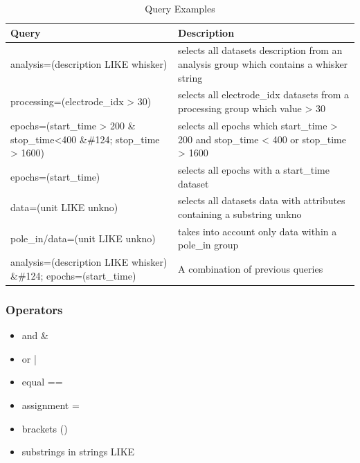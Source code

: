 \documentclass[utf8]{frontiersSCNS} %
\begin{document}
\begin{table}
\caption{Query Examples}
\label{tab:query-examples}       %

\begin{tabular}{ |p{7cm}|p{9cm}| }
\hline
	 \textbf{Query}                                  &       \textbf{Description} \\ \hline
	
	 analysis=(description LIKE whisker)  &  selects all datasets description from an analysis group which contains a whisker string  \\ \hline
	 processing=(electrode\_idx > 30)        &  selects all electrode\_idx datasets from a processing group which value > 30   \\ \hline
	 epochs=(start\_time > 200 \& stop\_time<400 \&\#124; stop\_time > 1600)  &  selects all epochs which start\_time > 200 and stop\_time < 400 or stop\_time > 1600 \\ \hline
	 epochs=(start\_time)                     &  selects all epochs with a start\_time dataset         \\ \hline
	 data=(unit LIKE unkno)  &  selects all datasets data with attributes containing a substring unkno \\ \hline
	 pole\_in/data=(unit LIKE unkno)  &  takes into account only data within a pole\_in group \\ \hline
	 analysis=(description LIKE whisker) \&\#124; epochs=(start\_time)   &  A combination of previous queries \\ \hline

\end{tabular}

\end{table}



\subsubsection{Operators}


\begin{itemize}
 \item and \&
 \item or  |
 \item equal ==
 \item assignment =
 \item brackets ()
 \item substrings in strings LIKE
\end{itemize}
\end{document}
